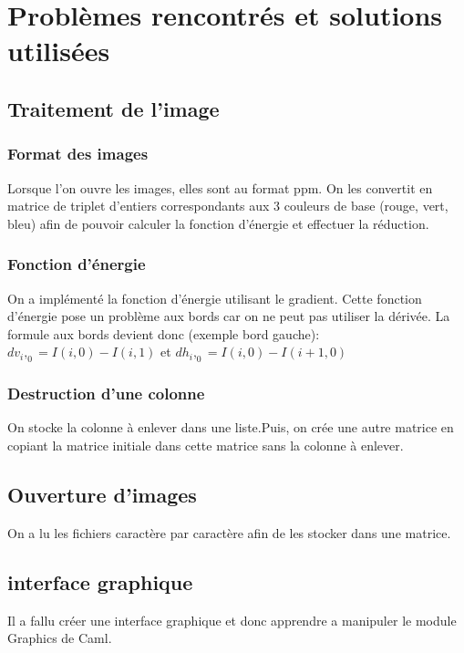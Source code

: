 \documentclass[a4paper]{article}
\begin{document}
\section{Problèmes rencontrés et solutions utilisées}



\subsection{Traitement de l'image}

\subsubsection{Format des images}

Lorsque l'on ouvre les images, elles sont au format ppm. On les convertit en matrice de triplet d'entiers correspondants aux 3 couleurs de base (rouge, vert, bleu) afin de pouvoir calculer la fonction d'énergie et effectuer la réduction. 

\subsubsection{Fonction d'énergie}

On a implémenté la fonction d'énergie utilisant le gradient. Cette fonction d'énergie pose un problème aux bords car on ne peut pas utiliser la dérivée. La formule aux bords devient donc (exemple bord gauche):
$dv_i,_0=I(i,0)-I(i,1)$ et $dh_i,_0 = I(i,0)-I(i+1,0)$

\subsubsection{Destruction d'une colonne}

On stocke la colonne à enlever dans une liste.Puis, on crée une autre matrice en copiant la matrice initiale dans cette matrice sans la colonne à enlever.
 
\subsection{Ouverture d'images}

On a lu les fichiers caractère par caractère afin de les stocker dans une matrice. 


\subsection{interface graphique}
Il a fallu créer une interface graphique et donc apprendre a manipuler le module Graphics de Caml.
\end{document}
